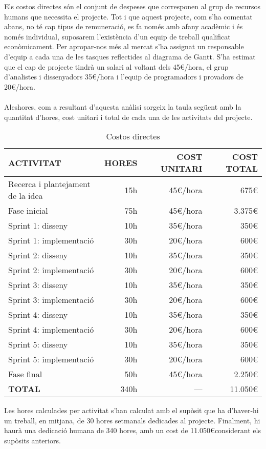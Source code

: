 Els costos directes són el conjunt de despeses que corresponen al grup de recursos humans que necessita el projecte. Tot i que aquest projecte, com s’ha comentat abans, no té cap tipus de remuneració, es fa només amb afany acadèmic i és només individual, suposarem l’existència d’un equip de treball qualificat econòmicament. Per apropar-nos més al mercat s’ha assignat un responsable d’equip a cada una de les tasques reflectides al diagrama de Gantt. S’ha estimat que el cap de projecte tindrà un salari al voltant dels 45\euro/hora, el grup d’analistes i dissenyadors 35\euro/hora i l’equip de programadors i provadors de 20\euro/hora.
\\\\
Aleshores, com a resultant d’aquesta anàlisi sorgeix la taula següent amb la quantitat d’hores, cost unitari i total de cada una de les activitats del projecte.
\\
\begin{table}[H]
\centering
\begin{tabular}{ | l | r | r | r |}
\hline
\textbf{ACTIVITAT}&\textbf{HORES}&\textbf{COST UNITARI}&\textbf{COST TOTAL} 		\\ \hline
Recerca i plantejament de la idea 	& 15h 		& 45\euro/hora	& 675\euro			\\ \hline
Fase inicial					 	& 75h 		& 45\euro/hora	& 3.375\euro		\\ \hline
Sprint 1: disseny				 	& 10h 		& 35\euro/hora	& 350\euro			\\ \hline
Sprint 1: implementació			 	& 30h 		& 20\euro/hora	& 600\euro			\\ \hline
Sprint 2: disseny				 	& 10h 		& 35\euro/hora	& 350\euro			\\ \hline
Sprint 2: implementació			 	& 30h 		& 20\euro/hora	& 600\euro			\\ \hline
Sprint 3: disseny				 	& 10h 		& 35\euro/hora	& 350\euro			\\ \hline
Sprint 3: implementació			 	& 30h 		& 20\euro/hora	& 600\euro			\\ \hline
Sprint 4: disseny				 	& 10h 		& 35\euro/hora	& 350\euro			\\ \hline
Sprint 4: implementació			 	& 30h 		& 20\euro/hora	& 600\euro			\\ \hline
Sprint 5: disseny				 	& 10h 		& 35\euro/hora	& 350\euro			\\ \hline
Sprint 5: implementació			 	& 30h 		& 20\euro/hora	& 600\euro			\\ \hline
Fase final						 	& 50h 		& 45\euro/hora	& 2.250\euro		\\ \hline
\textbf{TOTAL}					 	& 340h 		& ---			& 11.050\euro		\\ 
\hline
\end{tabular}
\caption{Costos directes}
\end{table}
Les hores calculades per activitat s’han calculat amb el supòsit que ha d’haver-hi un treball, en mitjana, de 30 hores setmanals dedicades al projecte. Finalment, hi haurà una dedicació humana de 340 hores, amb un cost de 11.050\euro\space considerant els supòsits anteriors.

